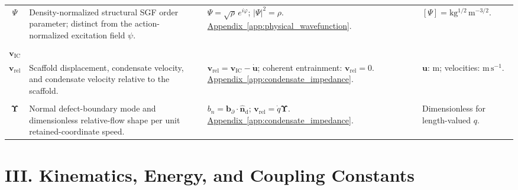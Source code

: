 \begin{longtable}{@{} c p{5.5cm} p{4cm} p{3.5cm} @{}}
$\Psi$ & {\raggedright Density-normalized structural SGF order parameter; distinct from the action-normalized excitation field $\psi$.\par} & {\raggedright $\Psi=\sqrt\rho\,e^{i\varphi}$; $|\Psi|^2=\rho$. \newline \hyperref[app:physical_wavefunction]{Appendix~\ref*{app:physical_wavefunction}}.\par} & {\raggedright $[\Psi]=\mathrm{kg^{1/2}\,m^{-3/2}}$.\par} \\

\begin{tabular}[c]{@{}c@{}}$\mathbf u$ \\ $\mathbf v_{\mathrm{IC}}$ \\ $\mathbf v_{\mathrm{rel}}$\end{tabular} & {\raggedright Scaffold displacement, condensate velocity, and condensate velocity relative to the scaffold.\par} & {\raggedright $\mathbf v_{\mathrm{rel}}=\mathbf v_{\mathrm{IC}}-\dot{\mathbf u}$; coherent entrainment: $\mathbf v_{\mathrm{rel}}=0$. \newline \hyperref[app:condensate_impedance]{Appendix~\ref*{app:condensate_impedance}}.\par} & {\raggedright $\mathbf u$: $\mathrm m$; velocities: $\mathrm{m\,s^{-1}}$.\par} \\

\begin{tabular}[c]{@{}c@{}}$b_n$ \\ $\boldsymbol\Upsilon$\end{tabular} & {\raggedright Normal defect-boundary mode and dimensionless relative-flow shape per unit retained-coordinate speed.\par} & {\raggedright $b_n=\mathbf b_\partial\cdot\widehat{\mathbf n}_{\mathrm d}$; $\mathbf v_{\mathrm{rel}}=\dot q\boldsymbol\Upsilon$. \newline \hyperref[app:condensate_impedance]{Appendix~\ref*{app:condensate_impedance}}.\par} & {\raggedright Dimensionless for length-valued $q$.\par} \\


\bottomrule
\end{longtable}

\vspace{1cm}

\section*{III. Kinematics, Energy, and Coupling Constants}

